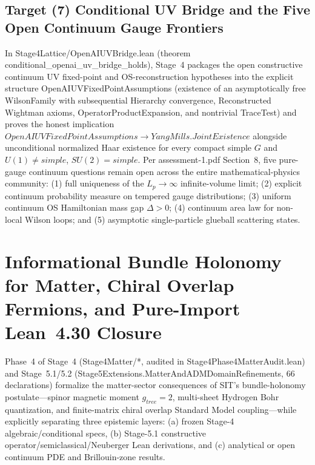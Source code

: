 \documentclass[american,11pt,letterpaper]{article}
\def\mathrm#1{#1}%
\def\texttt#1{#1}%
\begin{document}
\subsection{Target (7) Conditional UV Bridge and the Five Open Continuum Gauge Frontiers}

In \texttt{Stage4\allowbreak{}Lattice/Open\allowbreak{}AIUVBridge.\allowbreak{}lean} (theorem \texttt{conditional\_\allowbreak{}openai\_\allowbreak{}uv\_\allowbreak{}bridge\_\allowbreak{}holds}), Stage~4 packages the open constructive continuum UV fixed-point and OS-reconstruction hypotheses into the explicit structure \texttt{Open\allowbreak{}AIUVFixed\allowbreak{}Point\allowbreak{}Assumptions} (existence of an asymptotically free \texttt{WilsonFamily} with subsequential \texttt{Hierarchy} convergence, \texttt{Reconstructed} Wightman axioms, \texttt{Operator\allowbreak{}Product\allowbreak{}Expansion}, and nontrivial \texttt{TraceTest}) and proves the honest implication $\mathrm{OpenAIUVFixedPointAssumptions} \to \mathrm{YangMills.JointExistence}$ alongside unconditional normalized Haar existence for every compact simple $G$ and $U(1) \ne \mathrm{simple}$, $SU(2) = \mathrm{simple}$. Per \texttt{assessment-1.pdf} Section~8, five pure-gauge continuum questions remain open across the entire mathematical-physics community: (1) full uniqueness of the $L_p \to \infty$ infinite-volume limit; (2) explicit continuum probability measure on tempered gauge distributions; (3) uniform continuum OS Hamiltonian mass gap $\Delta > 0$; (4) continuum area law for non-local Wilson loops; and (5) asymptotic single-particle glueball scattering states.

\section{Informational Bundle Holonomy for Matter, Chiral Overlap Fermions, and Pure-Import Lean~4.30 Closure}
\label{sec:stage4-matter-holonomy}

Phase~4 of Stage~4 (\texttt{Stage4Matter/*}, audited in \texttt{Stage4\allowbreak{}Phase4\allowbreak{}Matter\allowbreak{}Audit.\allowbreak{}lean}) and Stage~5.1/5.2 (\texttt{Stage5\allowbreak{}Extensions.\allowbreak{}Matter\allowbreak{}And\allowbreak{}ADMDomain\allowbreak{}Refinements}, $66$ declarations) formalize the matter-sector consequences of SIT's bundle-holonomy postulate---spinor magnetic moment $g_{\mathrm{tree}} = 2$, multi-sheet Hydrogen Bohr quantization, and finite-matrix chiral overlap Standard Model coupling---while explicitly separating three epistemic layers: (a) frozen Stage-4 algebraic/conditional specs, (b) Stage-5.1 constructive operator/semiclassical/Neuberger Lean derivations, and (c) analytical or open continuum PDE and Brillouin-zone results.
\end{document}
